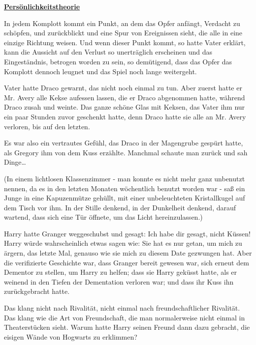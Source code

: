 

\hypertarget{persuxf6nlichkeitstheorie}{%

\textbf{\uline{Persönlichkeitstheorie}}

In jedem Komplott kommt ein Punkt, an dem das Opfer anfängt, Verdacht zu schöpfen, und zurückblickt und eine Spur von Ereignissen sieht, die alle in eine einzige Richtung weisen. Und wenn dieser Punkt kommt, so hatte Vater erklärt, kann die Aussicht auf den Verlust so unerträglich erscheinen und das Eingeständnis, betrogen worden zu sein, so demütigend, dass das Opfer das Komplott dennoch leugnet und das Spiel noch lange weitergeht.

Vater hatte Draco gewarnt, das nicht noch einmal zu tun. Aber zuerst hatte er Mr. Avery alle Kekse aufessen lassen, die er Draco abgenommen hatte, während Draco zusah und weinte. Das ganze schöne Glas mit Keksen, das Vater ihm nur ein paar Stunden zuvor geschenkt hatte, denn Draco hatte sie alle an Mr. Avery verloren, bis auf den letzten.

Es war also ein vertrautes Gefühl, das Draco in der Magengrube gespürt hatte, als Gregory ihm von dem Kuss erzählte. Manchmal schaute man zurück und sah Dinge…

(In einem lichtlosen Klassenzimmer - man konnte es nicht mehr ganz unbenutzt nennen, da es in den letzten Monaten wöchentlich benutzt worden war - saß ein Junge in eine Kapuzenmütze gehüllt, mit einer unbeleuchteten Kristallkugel auf dem Tisch vor ihm. In der Stille denkend, in der Dunkelheit denkend, darauf wartend, dass sich eine Tür öffnete, um das Licht hereinzulassen.)

Harry hatte Granger weggeschubst und gesagt: Ich habe dir gesagt, nicht Küssen! Harry würde wahrscheinlich etwas sagen wie: Sie hat es nur getan, um mich zu ärgern, das letzte Mal, genauso wie sie mich zu diesem Date gezwungen hat. Aber die verifizierte Geschichte war, dass Granger bereit gewesen war, sich erneut dem Dementor zu stellen, um Harry zu helfen; dass sie Harry geküsst hatte, als er weinend in den Tiefen der Dementation verloren war; und dass ihr Kuss ihn zurückgebracht hatte.

Das klang nicht nach Rivalität, nicht einmal nach freundschaftlicher Rivalität. Das klang wie die Art von Freundschaft, die man normalerweise nicht einmal in Theaterstücken sieht. Warum hatte Harry seinen Freund dann dazu gebracht, die eisigen Wände von Hogwarts zu erklimmen?

}
